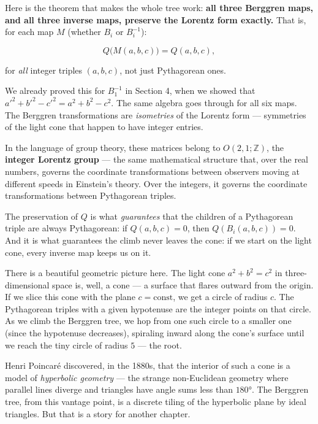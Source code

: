 Here is the theorem that makes the whole tree work: \textbf{all three Berggren maps, and all three inverse maps, preserve the Lorentz form exactly.} That is, for each map \(M\) (whether \(B_i\) or \(B_i^{-1}\)):

\[Q\bigl(M(a, b, c)\bigr) = Q(a, b, c),\]

for \emph{all} integer triples \((a, b, c)\), not just Pythagorean ones.

We already proved this for \(B_1^{-1}\) in Section 4, when we showed that \({a'}^2 + {b'}^2 - {c'}^2 = a^2 + b^2 - c^2\). The same algebra goes through for all six maps. The Berggren transformations are \emph{isometries} of the Lorentz form --- symmetries of the light cone that happen to have integer entries.

In the language of group theory, these matrices belong to \(O(2,1;\mathbb{Z})\), the \textbf{integer Lorentz group} --- the same mathematical structure that, over the real numbers, governs the coordinate transformations between observers moving at different speeds in Einstein's theory. Over the integers, it governs the coordinate transformations between Pythagorean triples.

The preservation of \(Q\) is what \emph{guarantees} that the children of a Pythagorean triple are always Pythagorean: if \(Q(a,b,c) = 0\), then \(Q(B_i(a,b,c)) = 0\). And it is what guarantees the climb never leaves the cone: if we start on the light cone, every inverse map keeps us on it.

There is a beautiful geometric picture here. The light cone \(a^2 + b^2 = c^2\) in three-dimensional space is, well, a cone --- a surface that flares outward from the origin. If we slice this cone with the plane \(c = \text{const}\), we get a circle of radius \(c\). The Pythagorean triples with a given hypotenuse are the integer points on that circle. As we climb the Berggren tree, we hop from one such circle to a smaller one (since the hypotenuse decreases), spiraling inward along the cone's surface until we reach the tiny circle of radius \(5\) --- the root.

Henri Poincaré discovered, in the 1880s, that the interior of such a cone is a model of \emph{hyperbolic geometry} --- the strange non-Euclidean geometry where parallel lines diverge and triangles have angle sums less than \(180°\). The Berggren tree, from this vantage point, is a discrete tiling of the hyperbolic plane by ideal triangles. But that is a story for another chapter.


